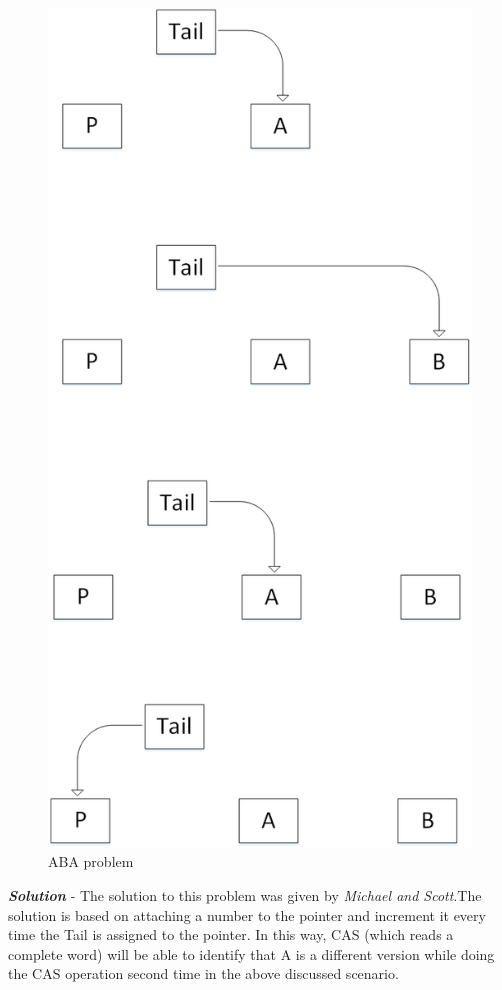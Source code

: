 \documentclass[twoside]{article}
\begin{document}
 \begin{figure}[H]
\centering
\includegraphics[scale=0.5]{ABA}
\caption{ABA problem}
\label{fig:2}
\end{figure}

\textbf{\textit{Solution}} - The solution to this problem was given by \textit{Michael and Scott}.The solution is based on attaching a number to the pointer and increment it every time the Tail is assigned to the pointer. In this way, CAS (which reads a complete word) will be able to identify that A is a different version while doing the CAS operation second time in the above discussed scenario.
\end{document}
